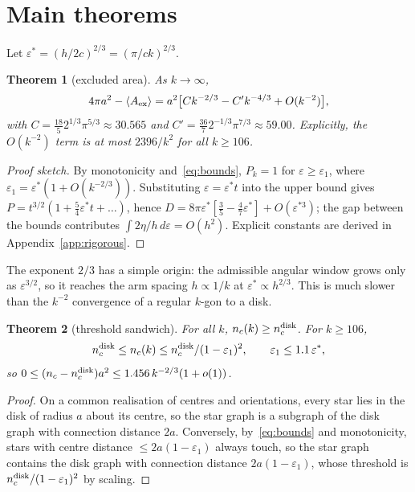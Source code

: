 \documentclass[pre,twocolumn,superscriptaddress,nofootinbib]{revtex4-2}
\newtheorem{theorem}{Theorem}
\newcommand{\Aex}{\langle A_{\rm ex}\rangle}
\newcommand{\nd}{n_c^{\rm disk}}
\begin{document}
\section{Main theorems}
Let $\varepsilon^*=(h/2c)^{2/3}=(\pi/ck)^{2/3}$.

\begin{theorem}[excluded area]
As $k\to\infty$,
\begin{equation}
4\pi a^2-\Aex=a^2\bigl[Ck^{-2/3}-C'k^{-4/3}+O(k^{-2})\bigr],\label{eq:thm1}
\end{equation}
with $C=\tfrac{18}{5}2^{1/3}\pi^{5/3}\approx30.565$ and $C'=\tfrac{36}{7}2^{-1/3}\pi^{7/3}\approx59.00$.
Explicitly, the $O(k^{-2})$ term is at most $2396/k^2$ for all $k\ge106$.
\end{theorem}
\begin{proof}[Proof sketch]
By monotonicity and~\eqref{eq:bounds}, $P_k=1$ for $\varepsilon\ge\varepsilon_1$, where $\varepsilon_1=\varepsilon^*(1+O(k^{-2/3}))$.
Substituting $\varepsilon=\varepsilon^*t$ into the upper bound gives $P=t^{3/2}(1+\tfrac54\varepsilon^*t+\dots)$, hence $D=8\pi\varepsilon^*[\tfrac35-\tfrac47\varepsilon^*]+O(\varepsilon^{*3})$; the gap between the bounds contributes $\int2\eta/h\,d\varepsilon=O(h^2)$.
Explicit constants are derived in Appendix~\ref{app:rigorous}.
\end{proof}

The exponent $2/3$ has a simple origin: the admissible angular window grows only as $\varepsilon^{3/2}$, so it reaches the arm spacing $h\propto1/k$ at $\varepsilon^*\propto h^{2/3}$.
This is much slower than the $k^{-2}$ convergence of a regular $k$-gon to a disk.

\begin{theorem}[threshold sandwich]
For all $k$, $n_c(k)\ge\nd$. For $k\ge106$,
\begin{equation}
\nd\le n_c(k)\le\nd/(1-\varepsilon_1)^2,\qquad\varepsilon_1\le1.1\,\varepsilon^*,\label{eq:thm2}
\end{equation}
so $0\le(n_c-\nd)a^2\le1.456\,k^{-2/3}(1+o(1))$.
\end{theorem}
\begin{proof}
On a common realisation of centres and orientations, every star lies in the disk of radius $a$ about its centre, so the star graph is a subgraph of the disk graph with connection distance $2a$.
Conversely, by~\eqref{eq:bounds} and monotonicity, stars with centre distance $\le2a(1-\varepsilon_1)$ always touch, so the star graph contains the disk graph with connection distance $2a(1-\varepsilon_1)$, whose threshold is $\nd/(1-\varepsilon_1)^2$ by scaling.
\end{proof}
\end{document}
